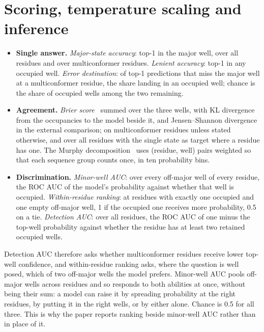 \documentclass[10pt,twocolumn,a4paper]{article}
\begin{document}
\section{Scoring, temperature scaling and inference}\label{app:inference}
\begin{itemize}\setlength{\itemsep}{0pt}\setlength{\parskip}{0pt}
\item \textbf{Single answer.} \emph{Major-state accuracy}: top-1 in the major well, over
  all residues and over multiconformer residues. \emph{Lenient accuracy}: top-1 in any
  occupied well. \emph{Error destination}: of top-1 predictions that miss the major well
  at a multiconformer residue, the share landing in an occupied well; chance is the share
  of occupied wells among the two remaining.
\item \textbf{Agreement.} \emph{Brier score}~\citep{brier1950verification} summed over the
  three wells, with KL divergence from the occupancies to the model beside it, and
  Jensen--Shannon divergence in the external comparison; on multiconformer residues unless
  stated otherwise, and over all residues with the single state as target where a residue
  has one. The Murphy decomposition~\citep{murphy1973partition} uses (residue, well) pairs
  weighted so that each sequence group counts once, in ten probability bins.
\item \textbf{Discrimination.} \emph{Minor-well AUC}: over every off-major well of every
  residue, the ROC AUC of the model's probability against whether that well is occupied.
  \emph{Within-residue ranking}: at residues with exactly one occupied and one empty
  off-major well, 1 if the occupied one receives more probability, 0.5 on a tie.
  \emph{Detection AUC}: over all residues, the ROC AUC of one minus the top-well
  probability against whether the residue has at least two retained occupied wells.
\end{itemize}

Detection AUC therefore asks whether multiconformer residues receive lower top-well
confidence, and within-residue ranking asks, where the question is well posed, which of
two off-major wells the model prefers. Minor-well AUC pools off-major wells across
residues and so responds to both abilities at once, without being their sum: a model can
raise it by spreading probability at the right residues, by putting it in the right wells,
or by either alone. Chance is 0.5 for all three. This is why the paper reports ranking
beside minor-well AUC rather than in place of it.
\end{document}
